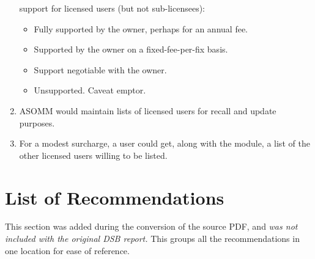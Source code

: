 \documentclass[12pt,final]{article}
\begin{document}
\begin{enumerate}
        support for licensed users (but not sub-licensees):
\begin{itemize}
        \item Fully supported by the owner, perhaps for an annual fee.
        \item Supported by the owner on a fixed-fee-per-fix basis.
        \item Support negotiable with the owner.
        \item Unsupported. Caveat emptor.
\end{itemize}
    \item ASOMM would maintain lists of licensed users for recall and update
        purposes.
    \item For a modest surcharge, a user could get, along with the module, a
        list of the other licensed users willing to be listed.
\end{enumerate}

\newpage

\section*{List of Recommendations}

This section was added during the conversion of the source PDF, and \emph{was not
included with the original DSB report.} This groups all the recommendations
in one location for ease of reference.
\end{document}
